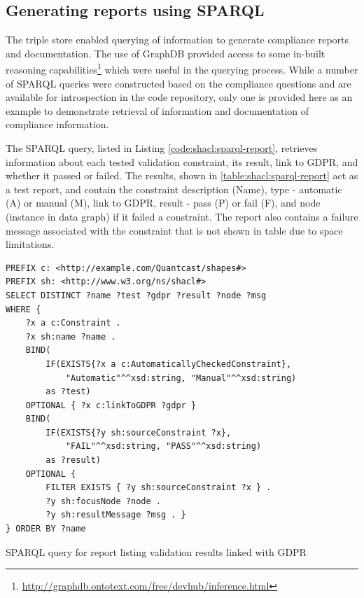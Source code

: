 \subsection{Generating reports using SPARQL}\label{sec:testing:shacl:reports}
The triple store enabled querying of information to generate compliance reports and documentation.
The use of GraphDB provided access to some in-built reasoning capabilities\footnote{\url{http://graphdb.ontotext.com/free/devhub/inference.html}} which were useful in the querying process.
While a number of SPARQL queries were constructed based on the compliance questions and are available for introspection in the code repository, only one is provided here as an example to demonstrate retrieval of information and documentation of compliance information.

The SPARQL query, listed in Listing \autoref{code:shacl:sparql-report}, retrieves information about each tested validation constraint, its result, link to GDPR, and whether it passed or failed.
The results, shown in \autoref{table:shacl:sparql-report} act as a test report, and contain the constraint description (Name), type - automatic (A) or manual (M), link to GDPR, result - pass (P) or fail (F), and node (instance in data graph) if it failed a constraint.
The report also contains a failure message associated with the constraint that is not shown in table due to space limitations.
\begin{listing}[htbp]
\begin{verbatim}
PREFIX c: <http://example.com/Quantcast/shapes#>
PREFIX sh: <http://www.w3.org/ns/shacl#>
SELECT DISTINCT ?name ?test ?gdpr ?result ?node ?msg
WHERE {
    ?x a c:Constraint .
    ?x sh:name ?name .
    BIND(
        IF(EXISTS{?x a c:AutomaticallyCheckedConstraint},
            "Automatic"^^xsd:string, "Manual"^^xsd:string)
        as ?test)
    OPTIONAL { ?x c:linkToGDPR ?gdpr }
    BIND(
        IF(EXISTS{?y sh:sourceConstraint ?x},
            "FAIL"^^xsd:string, "PASS"^^xsd:string)
        as ?result)
    OPTIONAL {
        FILTER EXISTS { ?y sh:sourceConstraint ?x } .
        ?y sh:focusNode ?node .
    	?y sh:resultMessage ?msg . }
} ORDER BY ?name
\end{verbatim}
\caption{SPARQL query for report listing validation results linked with GDPR}
\label{code:shacl:sparql-report}
\end{listing}



